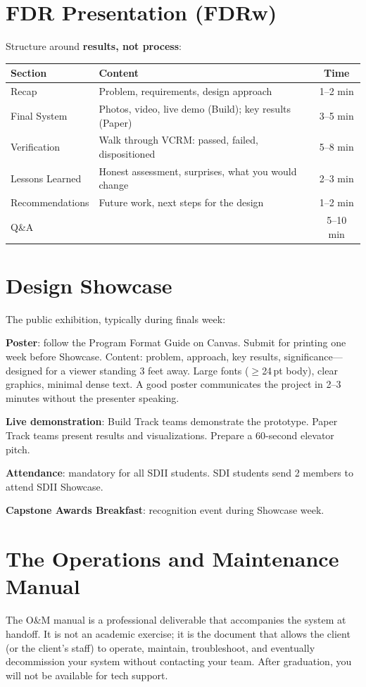 \section{FDR Presentation (FDRw)}
Structure around \textbf{results, not process}:

\begin{center}\small
\begin{tabularx}{\textwidth}{lXc}
\toprule
\textbf{Section} & \textbf{Content} & \textbf{Time} \\
\midrule
Recap & Problem, requirements, design approach & 1--2 min \\
Final System & Photos, video, live demo (Build); key results (Paper) & 3--5 min \\
Verification & Walk through VCRM: passed, failed, dispositioned & 5--8 min \\
Lessons Learned & Honest assessment, surprises, what you would change & 2--3 min \\
Recommendations & Future work, next steps for the design & 1--2 min \\
Q\&A & & 5--10 min \\
\bottomrule
\end{tabularx}
\end{center}

\section{Design Showcase}
The public exhibition, typically during finals week:

\textbf{Poster}: follow the Program Format Guide on Canvas. Submit for printing one week before Showcase. Content: problem, approach, key results, significance---designed for a viewer standing 3 feet away. Large fonts ($\geq$24\,pt body), clear graphics, minimal dense text. A good poster communicates the project in 2--3 minutes without the presenter speaking.

\textbf{Live demonstration}: Build Track teams demonstrate the prototype. Paper Track teams present results and visualizations. Prepare a 60-second elevator pitch.

\textbf{Attendance}: mandatory for all SDII students. SDI students send 2 members to attend SDII Showcase.

\textbf{Capstone Awards Breakfast}: recognition event during Showcase week.

\section{The Operations and Maintenance Manual}
The O\&M manual is a professional deliverable that accompanies the system at handoff. It is not an academic exercise; it is the document that allows the client (or the client's staff) to operate, maintain, troubleshoot, and eventually decommission your system without contacting your team. After graduation, you will not be available for tech support.

